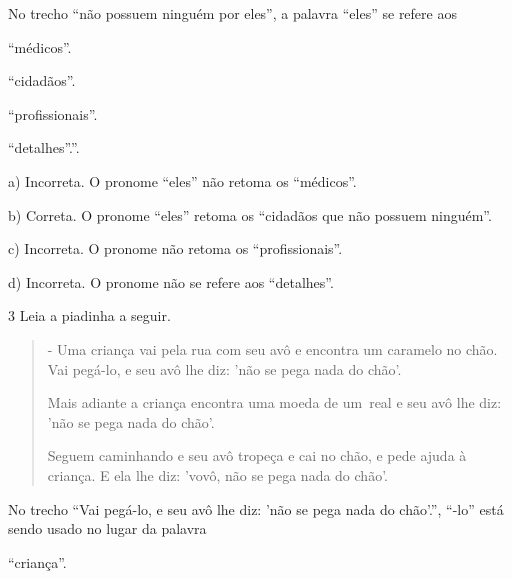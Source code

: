 \begin{escolha}
\begin{escolha}
\begin{quote}
\end{quote}

No trecho ``não possuem ninguém por eles'', a palavra ``eles'' se refere aos

\begin{escolha}
\item ``médicos''.

\item ``cidadãos''.

\item ``profissionais''.

\item ``detalhes''.''.
\end{escolha}


a)  Incorreta. O pronome ``eles'' não retoma os ``médicos''.

b)  Correta. O pronome ``eles'' retoma os ``cidadãos que não possuem
ninguém''.

c)  Incorreta. O pronome não retoma os ``profissionais''.

d)  Incorreta. O pronome não se refere aos ``detalhes''.

\num{3} Leia a piadinha a seguir.

\begin{quote}
- Uma criança vai pela rua com seu avô e encontra um caramelo no chão.
Vai pegá-lo, e seu avô lhe diz: 'não se pega nada do chão'.

Mais adiante a criança encontra uma moeda de um~real e seu avô lhe diz:
'não se pega nada do chão'.~

Seguem caminhando e seu avô tropeça e cai no chão, e pede ajuda à
criança. E ela lhe diz: 'vovô, não se pega nada do chão'.
\end{quote}


No trecho ``Vai pegá-lo, e seu avô lhe diz: 'não se pega nada do
chão'.'', ``-lo'' está sendo usado no lugar da palavra

\begin{escolha}
\item ``criança''.


\end{escolha}
\end{escolha}
\end{escolha}
